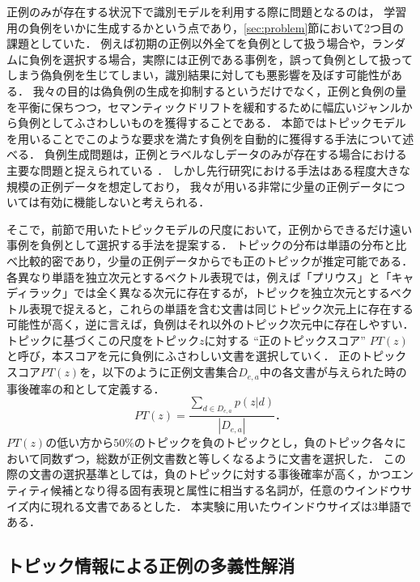\documentclass[japanese]{jnlp_1.4}
\begin{document}
正例のみが存在する状況下で識別モデルを利用する際に問題となるのは，
学習用の負例をいかに生成するかという点であり，\ref{sec:problem}節において2つ目の課題としていた．
例えば初期の正例以外全てを負例として扱う場合や，ランダムに負例を選択する場合，実際には正例である事例を，誤って負例として扱ってしまう偽負例を生じてしまい，識別結果に対しても悪影響を及ぼす可能性がある．
我々の目的は偽負例の生成を抑制するというだけでなく，正例と負例の量を平衡に保ちつつ，セマンティックドリフトを緩和するために幅広いジャンルから負例としてふさわしいものを獲得することである．
本節ではトピックモデルを用いることでこのような要求を満たす負例を自動的に獲得する手法について述べる．
負例生成問題は，正例とラベルなしデータのみが存在する場合における主要な問題と捉えられている \cite{liu2002partially,li2010negative}．
しかし先行研究における手法はある程度大きな規模の正例データを想定しており，
我々が用いる非常に少量の正例データについては有効に機能しないと考えられる．




そこで，前節で用いたトピックモデルの尺度において，正例からできるだけ遠い事例を負例として選択する手法を提案する．
トピックの分布は単語の分布と比べ比較的密であり，少量の正例データからでも正のトピックが推定可能である．
各異なり単語を独立次元とするベクトル表現では，例えば「プリウス」と「キャディラック」では全く異なる次元に存在するが，トピックを独立次元とするベクトル表現で捉えると，これらの単語を含む文書は同じトピック次元上に存在する可能性が高く，逆に言えば，負例はそれ以外のトピック次元中に存在しやすい．
トピックに基づくこの尺度をトピック$z$に対する ``正のトピックスコア'' $PT(z)$ と呼び，本スコアを元に負例にふさわしい文書を選択していく．
正のトピックスコア$PT(z)$を，以下のように正例文書集合$D_{e,a}$中の各文書が与えられた時の事後確率の和として定義する．
\begin{equation}
PT(z)=\frac{\sum_{d \in {D_{e,a}}} p(z|d)}{|D_{e,a}|}．
\end{equation}
$PT(z)$の低い方から$50\%$のトピックを負のトピックとし，負のトピック各々において同数ずつ，総数が正例文書数と等しくなるように文書を選択した．
この際の文書の選択基準としては，負のトピックに対する事後確率が高く，かつエンティティ候補となり得る固有表現と属性に相当する名詞が，任意のウインドウサイズ内に現れる文書であるとした．
本実験に用いたウインドウサイズは3単語である．


\subsection{トピック情報による正例の多義性解消}
\label{sec:tpc_sel}
\end{document}
